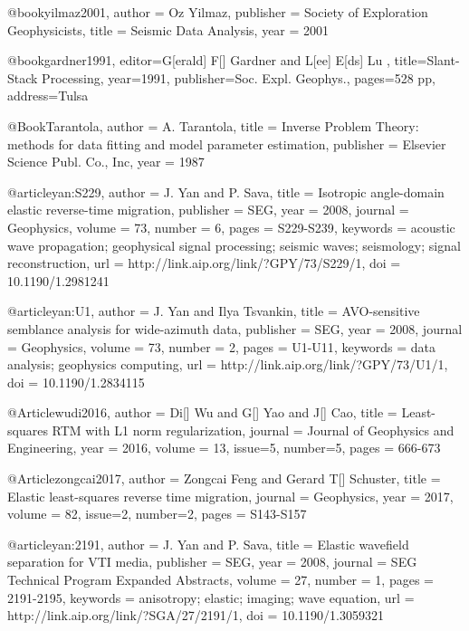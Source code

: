 @book{yilmaz2001,
   author = {Oz Yilmaz},
   publisher = {Society of Exploration Geophysicists},
   title = {Seismic Data Analysis},
   year = {2001}
}

@book{gardner1991,
  editor={G[erald] F[]  Gardner  and L[ee] E[ds]  Lu },
  title={Slant-Stack Processing},
  year=1991,
  publisher={Soc. Expl. Geophys.},
  pages={528 pp},
  address={Tulsa}
}



@Book{Tarantola,
  author = 	 {A. Tarantola},
  title = 	 {Inverse {P}roblem {T}heory: methods for data
                 fitting and model parameter estimation},
  publisher = 	 {Elsevier Science Publ. Co., Inc},
  year = 	 1987
}

@article{yan:S229,
  author =	 {J. Yan and P. Sava},
  title =	 {Isotropic angle-domain elastic reverse-time
                  migration},
  publisher =	 {SEG},
  year =	 2008,
  journal =	 {Geophysics},
  volume =	 73,
  number =	 6,
  pages =	 {S229-S239},
  keywords =	 {acoustic wave propagation; geophysical signal
                  processing; seismic waves; seismology; signal
                  reconstruction},
  url =		 {http://link.aip.org/link/?GPY/73/S229/1},
  doi =		 {10.1190/1.2981241}
}

@article{yan:U1,
  author =	 {J. Yan and Ilya Tsvankin},
  title =	 {AVO-sensitive semblance analysis for wide-azimuth
                  data},
  publisher =	 {SEG},
  year =	 2008,
  journal =	 {Geophysics},
  volume =	 73,
  number =	 2,
  pages =	 {U1-U11},
  keywords =	 {data analysis; geophysics computing},
  url =		 {http://link.aip.org/link/?GPY/73/U1/1},
  doi =		 {10.1190/1.2834115}
}



@Article{wudi2016,
  author = 	 {Di[] Wu and G[] Yao and J[] Cao},
  title = 	 {Least-squares RTM with {L}1 norm regularization},
  journal = 	 {Journal of Geophysics and Engineering},
  year = 	 2016,
  volume = 	 13,
  issue=5,
  number=5,
  pages = 	 {666-673}}
  

@Article{zongcai2017,
  author = 	 {Zongcai Feng and Gerard T[] Schuster},
  title = 	 {Elastic least-squares reverse time migration},
  journal = 	 {Geophysics},
  year = 	 2017,
  volume = 	 82,
  issue=2,
  number=2,
  pages = 	 {S143-S157}}
  
@article{yan:2191,
  author =	 {J. Yan and P. Sava},
  title =	 {Elastic wavefield separation for {VTI} media},
  publisher =	 {SEG},
  year =	 2008,
  journal =	 {SEG Technical Program Expanded Abstracts},
  volume =	 27,
  number =	 1,
  pages =	 {2191-2195},
  keywords =	 {anisotropy; elastic; imaging; wave equation},
  url =		 {http://link.aip.org/link/?SGA/27/2191/1},
  doi =		 {10.1190/1.3059321}
}


